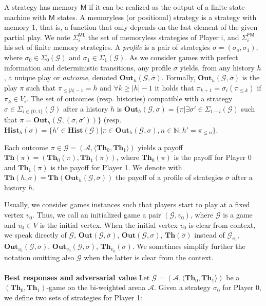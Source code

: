 A strategy has memory $\mathsf{M}$ if it can be realized as the output of a finite state machine with $\mathsf{M}$ states. A memoryless (or positional) strategy is a strategy with memory 1, that is, a function that only depends on the last element of the given partial play. We note $\Sigma^{\mathsf{ML}}_i$ the set of memoryless strategies of Player i, and $\Sigma^{\mathsf{FM}}_i$ his set of finite memory strategies. A \textit{profile} is a pair of strategies $\overline{\sigma} = (\sigma_o, \sigma_1)$, where $\sigma_0 \in \Sigma_0(\mathcal{G})$ and $\sigma_1 \in \Sigma_1(\mathcal{G})$. As we consider games with perfect information and deterministic transitions, any profile $\overline{\sigma}$ yields, from any history $h$, a unique play or \textit{outcome}, denoted $\mathbf{Out}_h(\mathcal{G}, \overline{\sigma})$. Formally, $\mathbf{Out}_h(\mathcal{G}, \overline{\sigma})$ is the play $\pi$ such that $\pi_{\leqslant|h|-1} = h$ and $\forall k \geqslant |h|-1$ it holds that $\pi_{k+1}=\sigma_i(\pi_{\leqslant k})$ if $\pi_k \in V_i$. The set of outcomes (resp. histories) compatible with a strategy $\sigma \in \Sigma_{i\in\{0,1\}}(\mathcal{G})$ after a history $h$ is $\mathbf{Out}_h(\mathcal{G}, \sigma) = \{ \pi | \exists \sigma'\in \Sigma_{1-i}(\mathcal{G}) $ such that $\pi = \mathbf{Out}_h(\mathcal{G}, (\sigma,\sigma'))\}$ (resp. $\mathbf{Hist}_h(\sigma) = \{h' \in \mathbf{Hist}(\mathcal{G}) | \pi \in \mathbf{Out}_h(\mathcal{G}, \sigma), n \in \mathbb{N}:h'= \pi_{\leqslant n}\}$.

Each outcome $\pi \in \mathcal{G} = (\mathcal{A},\langle \mathbf{Th}_0, \mathbf{Th}_1\rangle)$ yields a payoff $\mathbf{Th}(\pi)=(\mathbf{Th}_0(\pi),\mathbf{Th}_1(\pi))$, where $\mathbf{Th}_0(\pi)$ is the payoff for Player 0 and $\mathbf{Th}_1(\pi)$ is the payoff for Player 1. We denote with $\mathbf{Th}(h, \sigma) = \mathbf{Th}(\mathbf{Out}_h(\mathcal{G}, \overline{\sigma}))$ the payoff of a profile of strategies $\overline{\sigma}$ after a history $h$.

Usually, we consider games instances such that players start to play at a fixed vertex $v_0$. Thus, we call an initialized game a pair $(\mathcal{G}, v_0)$, where $\mathcal{G}$ is a game and $v_0 \in V$ is the initial vertex. When the initial vertex $v_0$ is clear from context, we speak directly of $\mathcal{G}$, $\mathbf{Out}(\mathcal{G}, \overline{\sigma})$, $\mathbf{Out}(\mathcal{G},\sigma)$, $\mathbf{Th}(\overline{\sigma})$ instead of $\mathcal{G}_{v_0}$, $\mathbf{Out}_{v_0}(\mathcal{G}, \overline{\sigma})$, $\mathbf{Out}_{v_0}(\mathcal{G},\sigma)$, $\mathbf{Th}_{v_0}(\overline{\sigma})$. We sometimes simplify further the notation omitting also $\mathcal{G}$ when the latter is clear from the context.
\\
\\
\noindent\textbf{Best responses and adversarial value} Let $\mathcal{G} = (\mathcal{A},\langle \mathbf{Th}_0, \mathbf{Th}_1\rangle)$ be a $(\mathbf{Th}_0, \mathbf{Th}_1)$-game on the bi-weighted arena $\mathcal{A}$. Given a strategy $\sigma_0$ for Player 0, we define two sets of strategies for Player 1:
\\

